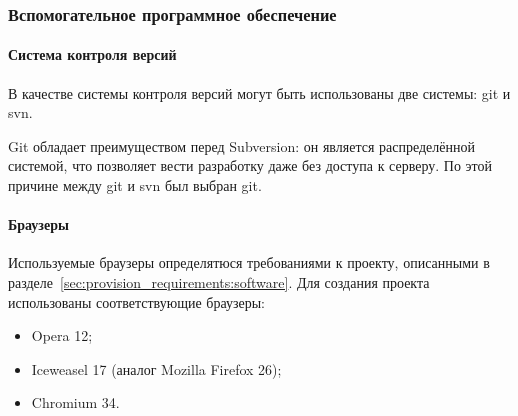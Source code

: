 \subsubsection{Вспомогательное программное обеспечение}


\paragraph{Система контроля версий}

В качестве системы контроля версий могут быть использованы две системы: git и svn.

Git обладает преимуществом перед Subversion: он является распределённой системой, что позволяет вести разработку даже без доступа к серверу. По этой причине между git и svn был выбран git.

\paragraph{Браузеры}

Используемые браузеры определятюся требованиями к проекту, описанными в разделе~\ref{sec:provision_requirements:software}. Для создания проекта использованы соответствующие браузеры:
\begin{itemize}
\item Opera 12;
\item Iceweasel 17 (аналог Mozilla Firefox 26);
\item Chromium 34.
\end{itemize}
